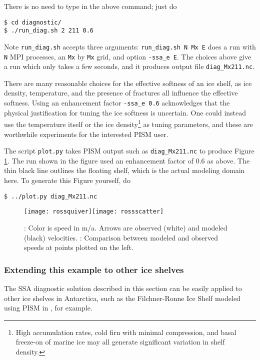 There is no need to type in the above command; just do

\begin{verbatim}
$ cd diagnostic/
$ ./run_diag.sh 2 211 0.6
\end{verbatim}

Note \texttt{run_diag.sh} accepts three arguments: \texttt{run_diag.sh N Mx E} does a run with
\texttt{N} MPI processes, an \texttt{Mx} by \texttt{Mx} grid, and option \texttt{-ssa_e E}.  The choices above give a run which only takes a few seconds, and it produces output file \texttt{diag_Mx211.nc}.

There are many reasonable choices for the effective softness of an ice shelf, as ice density, temperature, and the presence of fractures all influence the effective softness.  Using an enhancement factor \texttt{-ssa_e 0.6} acknowledges that the physical justification for tuning the ice softness is uncertain.  One could instead use the temperature itself or the ice density\footnote{High accumulation rates, cold firn with minimal compression, and basal freeze-on of marine ice may all generate significant variation in shelf density.} as tuning parameters, and these are worthwhile experiments for the interested PISM user.

The script \texttt{plot.py} takes PISM output such as \texttt{diag_Mx211.nc} to produce Figure \ref{fig:rosspython}.  The run shown in the figure used an enhancement factor of $0.6$ as above.  The thin black line outlines the floating shelf, which is the actual modeling domain here.  To generate this Figure yourself, do

\begin{verbatim}
$ ../plot.py diag_Mx211.nc
\end{verbatim}

\begin{figure}[ht]
\centering
\mbox{\texttt{[image: rossquiver]}\quad \texttt{[image: rossscatter]}}
\caption{: Color is speed in m/a.  Arrows are observed (white) and modeled (black) velocities.  : Comparison between modeled and observed speeds at points plotted on the left.}
\label{fig:rosspython}
\end{figure}

\subsubsection*{Extending this example to other ice shelves}  The SSA diagnostic solution described in this section can be easily applied to other ice shelves in Antarctica, such as the Filchner-Ronne Ice Shelf modeled using PISM in \cite{AlbrechtLevermann2012}, for example.

